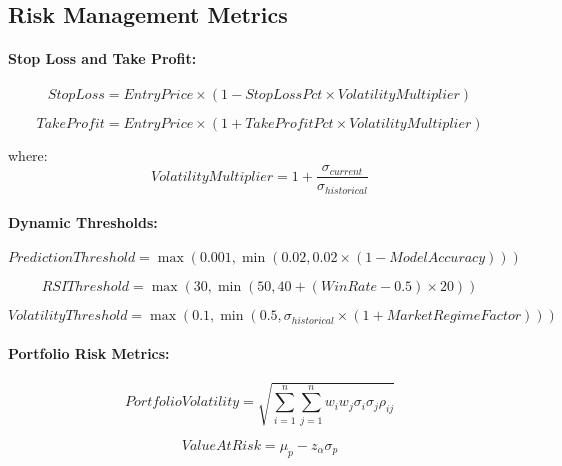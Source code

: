 \documentclass[conference]{IEEEtran}
\begin{document}
\subsection{Risk Management Metrics}

\paragraph{Stop Loss and Take Profit:}
\begin{equation}
StopLoss = EntryPrice \times (1 - StopLossPct \times VolatilityMultiplier)
\end{equation}

\begin{equation}
TakeProfit = EntryPrice \times (1 + TakeProfitPct \times VolatilityMultiplier)
\end{equation}

where:
\begin{equation}
VolatilityMultiplier = 1 + \frac{\sigma_{current}}{\sigma_{historical}}
\end{equation}

\paragraph{Dynamic Thresholds:}
\begin{equation}
PredictionThreshold = \max(0.001, \min(0.02, 0.02 \times (1 - ModelAccuracy)))
\end{equation}

\begin{equation}
RSIThreshold = \max(30, \min(50, 40 + (WinRate - 0.5) \times 20))
\end{equation}

\begin{equation}
VolatilityThreshold = \max(0.1, \min(0.5, \sigma_{historical} \times (1 + MarketRegimeFactor)))
\end{equation}

\paragraph{Portfolio Risk Metrics:}
\begin{equation}
PortfolioVolatility = \sqrt{\sum_{i=1}^n \sum_{j=1}^n w_i w_j \sigma_i \sigma_j \rho_{ij}}
\end{equation}

\begin{equation}
ValueAtRisk = \mu_p - z_\alpha \sigma_p
\end{equation}
\end{document}
